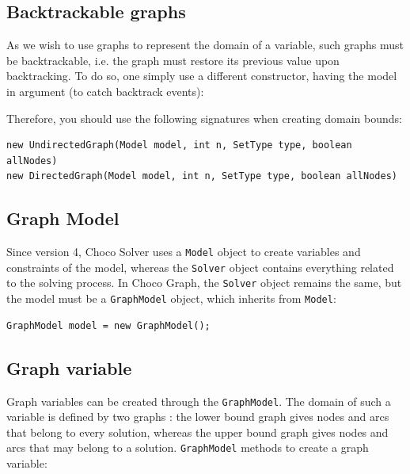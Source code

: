 \documentclass{article}
\begin{document}
\subsection{Backtrackable graphs}

As we wish to use graphs to represent the domain of a variable, such graphs must be backtrackable, i.e. the graph must restore its previous value upon backtracking. 
To do so, one simply use a different constructor, having the model in argument (to catch backtrack events):

Therefore, you should use the following signatures when creating domain bounds:
\begin{lstlisting}
new UndirectedGraph(Model model, int n, SetType type, boolean allNodes)
new DirectedGraph(Model model, int n, SetType type, boolean allNodes)
\end{lstlisting}

\subsection{Graph Model}

Since version 4, Choco Solver uses a \texttt{Model} object to create variables and constraints of the model, whereas the \texttt{Solver} object contains everything related to the solving process. In Choco Graph, the \texttt{Solver} object remains the same, but the model must be a \texttt{GraphModel} object, which inherits from \texttt{Model}:

\begin{lstlisting}
GraphModel model = new GraphModel();
\end{lstlisting}

\subsection{Graph variable}

Graph variables can be created through the \texttt{GraphModel}. The domain of such a variable is defined by two graphs : the lower bound graph gives nodes and arcs that belong to every solution, whereas the upper bound graph gives nodes and arcs that may belong to a solution. \texttt{GraphModel} methods to create a graph variable:
\end{document}
